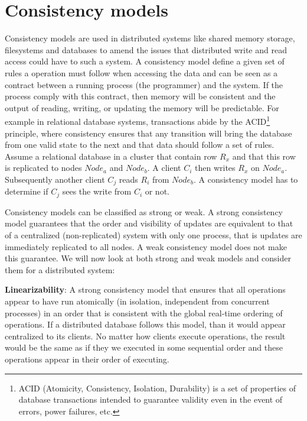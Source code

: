 \newpage
\section{Consistency models}

Consistency models are used in distributed systems like shared memory storage, filesystems and databases to amend the issues that distributed write and read access could have to such a system. A consistency model define a given set of rules a operation must follow when accessing the data and can be seen as a contract between a running process (the programmer) and the system. If the process comply with this contract, then memory will be consistent and the output of reading, writing, or updating the memory will be predictable. For example in relational database systems, transactions abide by the ACID\footnote{ACID (Atomicity, Consistency, Isolation, Durability) is a set of properties of database transactions intended to guarantee validity even in the event of errors, power failures, etc.} principle, where consistency ensures that any transition will bring the database from one valid state to the next and that data should follow a set of rules. Assume a relational database in a cluster that contain row $R_x$ and that this row is replicated to nodes $Node_a$ and $Node_b$. A client $C_i$ then writes $R_x$ on $Node_a$. Subsequently another client $C_j$ reads $R_i$ from $Node_b$. A consistency model has to determine if $C_j$ sees the write from $C_i$ or not.

\noindent Consistency models can be classified as strong or weak. A strong consistency model guarantees that the order and visibility of updates are equivalent to that of a centralized (non-replicated) system with only one process, that is updates are immediately replicated to all nodes. A weak consistency model does not make this guarantee. We will now look at both strong and weak models and consider them for a distributed system:

\noindent \textbf{Linearizability}: A strong consistency model that ensures that all operations appear to have run atomically (in isolation, independent from concurrent processes) in an order that is consistent with the global real-time ordering of operations. If a distributed database follows this model, than it would appear centralized to its clients. No matter how clients execute operations, the result would be the same as if they we executed in some sequential order and these operations appear in their order of executing.


